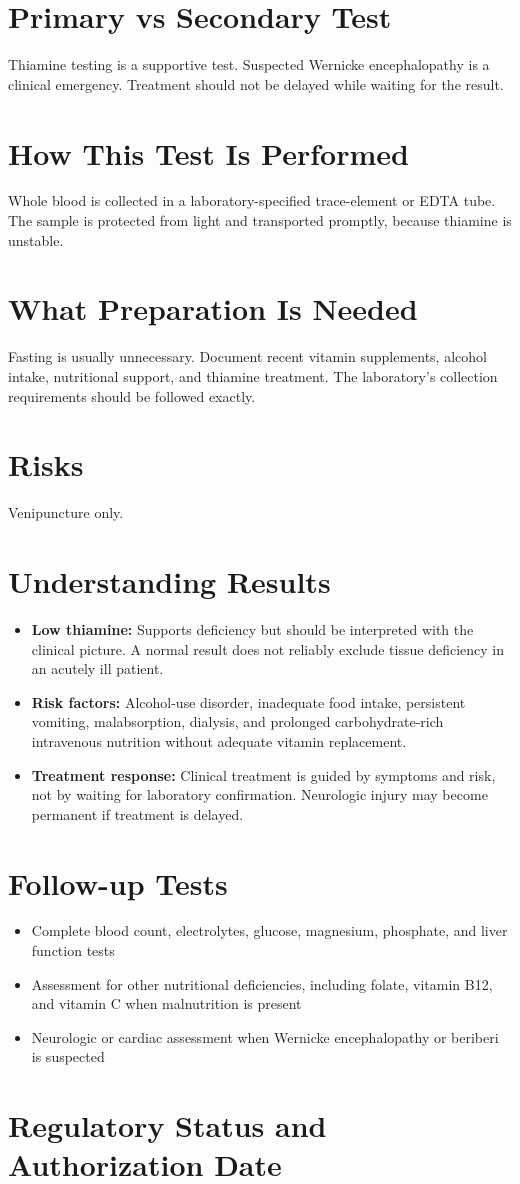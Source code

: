 \section*{Primary vs Secondary Test}
Thiamine testing is a supportive test. Suspected Wernicke encephalopathy is a clinical emergency. Treatment should not be delayed while waiting for the result.

\section*{How This Test Is Performed}
Whole blood is collected in a laboratory-specified trace-element or EDTA tube. The sample is protected from light and transported promptly, because thiamine is unstable.

\section*{What Preparation Is Needed}
Fasting is usually unnecessary. Document recent vitamin supplements, alcohol intake, nutritional support, and thiamine treatment. The laboratory's collection requirements should be followed exactly.

\section*{Risks}
Venipuncture only.

\section*{Understanding Results}
\begin{itemize}
  \item \textbf{Low thiamine:} Supports deficiency but should be interpreted with the clinical picture. A normal result does not reliably exclude tissue deficiency in an acutely ill patient.
  \item \textbf{Risk factors:} Alcohol-use disorder, inadequate food intake, persistent vomiting, malabsorption, dialysis, and prolonged carbohydrate-rich intravenous nutrition without adequate vitamin replacement.
  \item \textbf{Treatment response:} Clinical treatment is guided by symptoms and risk, not by waiting for laboratory confirmation. Neurologic injury may become permanent if treatment is delayed.
\end{itemize}

\section*{Follow-up Tests}
\begin{itemize}
  \item Complete blood count, electrolytes, glucose, magnesium, phosphate, and liver function tests
  \item Assessment for other nutritional deficiencies, including folate, vitamin B12, and vitamin C when malnutrition is present
  \item Neurologic or cardiac assessment when Wernicke encephalopathy or beriberi is suspected
\end{itemize}

\clearpage
\section*{Regulatory Status and Authorization Date}

\clearpage
